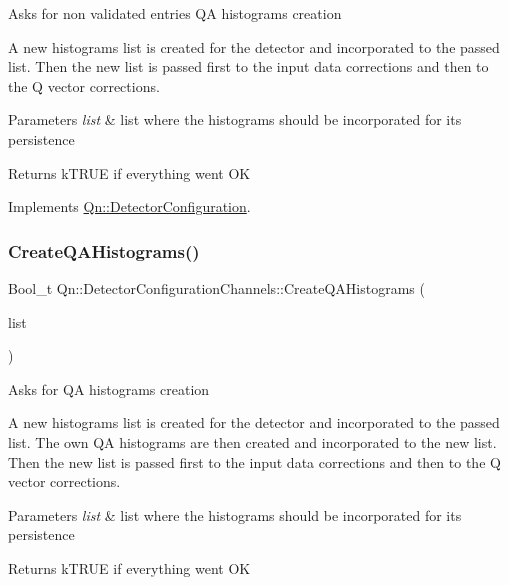 Asks for non validated entries QA histograms creation

A new histograms list is created for the detector and incorporated to the passed list. Then the new list is passed first to the input data corrections and then to the Q vector corrections. 
\begin{DoxyParams}{Parameters}
{\em list} & list where the histograms should be incorporated for its persistence \\
\hline
\end{DoxyParams}
\begin{DoxyReturn}{Returns}
k\+T\+R\+UE if everything went OK 
\end{DoxyReturn}


Implements \mbox{\hyperlink{classQn_1_1DetectorConfiguration_ade61875d8e7a05dd413c94d6887ae4ac}{Qn\+::\+Detector\+Configuration}}.

\mbox{\label{classQn_1_1DetectorConfigurationChannels_a0e3a0e4775decda04c3bad48534c297a}} 
\subsubsection{\texorpdfstring{Create\+Q\+A\+Histograms()}{CreateQAHistograms()}}
{\footnotesize\ttfamily Bool\+\_\+t Qn\+::\+Detector\+Configuration\+Channels\+::\+Create\+Q\+A\+Histograms (\begin{DoxyParamCaption}\item[{T\+List $\ast$}]{list }\end{DoxyParamCaption})\hspace{0.3cm}{\ttfamily [virtual]}}

Asks for QA histograms creation

A new histograms list is created for the detector and incorporated to the passed list. The own QA histograms are then created and incorporated to the new list. Then the new list is passed first to the input data corrections and then to the Q vector corrections. 
\begin{DoxyParams}{Parameters}
{\em list} & list where the histograms should be incorporated for its persistence \\
\hline
\end{DoxyParams}
\begin{DoxyReturn}{Returns}
k\+T\+R\+UE if everything went OK 
\end{DoxyReturn}



